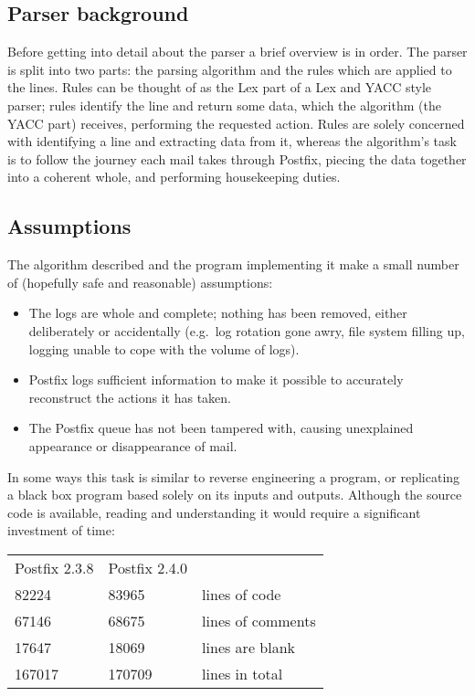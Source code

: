 \documentclass[a4paper,12pt,draft]{article}
\begin{document}
\subsection{Parser background}

Before getting into detail about the parser a brief overview is in order.
The parser is split into two parts: the parsing algorithm and the rules
which are applied to the lines.  Rules can be thought of as the Lex part of
a Lex and YACC style parser; rules identify the line and return some data,
which the algorithm (the YACC part) receives, performing the requested
action.  Rules are solely concerned with identifying a line and extracting
data from it, whereas the algorithm's task is to follow the journey each
mail takes through Postfix, piecing the data together into a coherent
whole, and performing housekeeping duties.


\subsection{Assumptions}

The algorithm described and the program implementing it make a small number
of (hopefully safe and reasonable) assumptions:

\begin{itemize}

    \item The logs are whole and complete; nothing has been removed, either
        deliberately or accidentally (e.g.\ log rotation gone awry, file
        system filling up, logging unable to cope with the volume of logs).

    \item Postfix logs sufficient information to make it possible to
        accurately reconstruct the actions it has taken.

    \item The Postfix queue has not been tampered with, causing unexplained
        appearance or disappearance of mail.

\end{itemize}

In some ways this task is similar to reverse engineering a program, or
replicating a black box program based solely on its inputs and outputs.
Although the source code is available, reading and understanding it would
require a significant investment of time:

\begin{tabular}[]{lll}

    Postfix 2.3.8   & Postfix 2.4.0 &                   \\
    82224           & 83965         & lines of code     \\
    67146           & 68675         & lines of comments \\
    17647           & 18069         & lines are blank   \\
    167017          & 170709        & lines in total    \\

\end{tabular}
\end{document}
